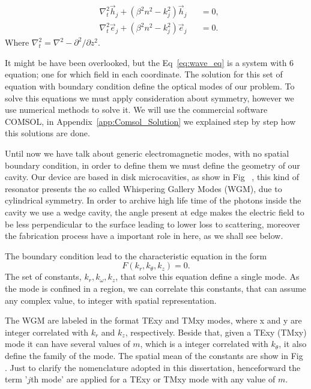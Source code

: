 \begin{subequations}
    \begin{alignat}{2}
    &\nabla_t^2\vec{h}_j+(\beta^2n^2-k_j^2)\vec{h}_j &&=0,\\
    &\nabla_t^2\vec{e}_j+(\beta^2n^2-k_j^2)\vec{e}_j &&=0.
    \end{alignat}
    \label{eq:wave_eq}
\end{subequations}
Where $\nabla_t^2 = \nabla^2 - \partial^2/\partial z^2$.

It might be have been overlooked, but the Eq~\ref{eq:wave_eq} is a system with 6 equation; one for which field in each coordinate. The solution for this set of equation with boundary condition define the optical modes of our problem. To solve this equations we must apply consideration about symmetry, however we use numerical methods to solve it. We will use the commercial software COMSOL\regmark, in Appendix~\ref{app:Comsol_Solution} we explained step by step how this solutions are done. 

Until now we have talk about generic electromagnetic modes, with no spatial boundary condition, in order to define them we must define the geometry of our cavity. Our device are based in disk microcavities, as show in Fig~%
, this kind of resonator presents the so called Whispering Gallery Modes (WGM), due to cylindrical symmetry. In order to archive high life time of the photons inside the cavity we use a wedge cavity, the angle present at edge makes the electric field to be less perpendicular to the surface leading to lower loss to scattering, moreover the fabrication process have a important role in here, as we shall see below. 

The boundary condition lead to the characteristic equation in the form 
\begin{equation}
    F(k_r,k_\theta,k_z) = 0.
\end{equation}
The set of constants, $k_r,k_\omega,k_z$, that solve this equation define a single mode. As the mode is confined in a region, we can correlate this constants, that can assume any complex value, to integer with spatial representation.

The WGM are labeled in the format TExy and TMxy modes, where x and y are integer correlated with $k_r$ and $k_z$, respectively. Beside that, given a TExy (TMxy) mode it can have several values of $m$, which is a integer correlated with $k_\theta$, it also define the family of the mode. The spatial mean of the constants are show in Fig~%
. Just to clarify the nomenclature adopted in this dissertation, henceforward the term '$j$th mode' are applied for a TExy or TMxy mode with any value of $m$. 

